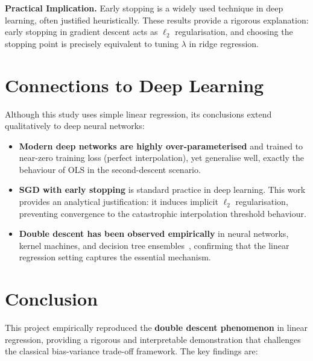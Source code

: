 \documentclass[12pt, a4paper]{article}
\begin{document}
\begin{keybox}
\textbf{Practical Implication.} Early stopping is a widely used technique in deep learning, often justified heuristically. These results provide a rigorous explanation: early stopping in gradient descent acts as $\ell_2$ regularisation, and choosing the stopping point is precisely equivalent to tuning $\lambda$ in ridge regression.
\end{keybox}

\section{Connections to Deep Learning}

Although this study uses simple linear regression, its conclusions extend qualitatively to deep neural networks:

\begin{itemize}
  \item \textbf{Modern deep networks are highly over-parameterised} and trained to near-zero training loss (perfect interpolation), yet generalise well, exactly the behaviour of OLS in the second-descent scenario.
  \item \textbf{SGD with early stopping} is standard practice in deep learning. This work provides an analytical justification: it induces implicit $\ell_2$ regularisation, preventing convergence to the catastrophic interpolation threshold behaviour.
  \item \textbf{Double descent has been observed empirically} in neural networks, kernel machines, and decision tree ensembles~\cite{belkin2019reconciling, nakkiran2020deep}, confirming that the linear regression setting captures the essential mechanism.
\end{itemize}

\section{Conclusion}

This project empirically reproduced the \textbf{double descent phenomenon} in linear regression, providing a rigorous and interpretable demonstration that challenges the classical bias-variance trade-off framework. The key findings are:
\end{document}
